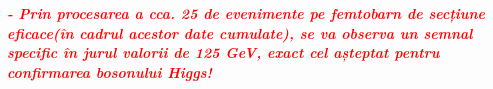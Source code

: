 \documentclass{beamer}
\begin{document}
 \begin{frame}{}


 \vspace{5.5cm}
 
 \small
 \makebox[0.5cm ]{} \textbf{\textit{ \textcolor{red}{ - Prin procesarea a cca. 25 de evenimente pe femtobarn de secțiune eficace(în cadrul acestor date cumulate), se va observa un semnal specific în jurul valorii de 125 GeV, exact cel așteptat pentru confirmarea bosonului Higgs! }}}\\


 \end{frame}


\end{document}
